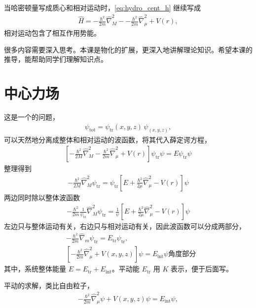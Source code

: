 当哈密顿量写成质心和相对运动时，\eqref{eq:hydro_cent_h} 继续写成
\begin{align}
    \hat H = -\frac{\hbar^2}{2m} \hat \nabla_M^2 -
    -\frac{\hbar^2}{2m} \hat \nabla_\mu^2 + V(r),
\end{align}
相对运动包含了相互作用势能。

很多内容需要深入思考。本课是物化的扩展，更深入地讲解理论知识。希望本课的推导，能帮助同学们理解知识点。

\section{中心力场}
这是一个的问题，
\begin{align}
    \psi_{\mathrm{tot}} = \psi_{\mathrm{tr}}(x,y,z) \,\psi_(x,y,z),
\end{align}
可以天然地分离成整体和相对运动的波函数，将其代入薛定谔方程，
\begin{align}
    \left[
        -\frac{\hbar^2}{2M}\hat\nabla_M^2 - \frac{\hbar^2}{2m} \hat\nabla_\mu^2 + V(r) 
    \right] \psi_{\mathrm{tr}} \psi = E \psi_{\mathrm{tr}} \psi
\end{align}
整理得到
\begin{align}
    - \frac{\hbar^2}{2M}\hat\nabla_M^2 \psi_{\mathrm{tr}} = \psi_{\mathrm{tr}} \left[
        E + \frac{\hbar^2}{2\mu}\hat\nabla_\mu^2 - V(r)
    \right]\psi
\end{align}
两边同时除以整体波函数
\begin{align}
    -\frac{\hbar^2}{2m} \frac1{\psi_{\mathrm{tr}}} \hat\nabla_M^2 \psi_{\mathrm{tr}} = \frac1{\psi} \left[
        E + \frac{\hbar^2}{2\mu}\hat\nabla_\mu^2 - V(r)
    \right]\psi
\end{align}
左边只与整体运动有关，右边只与相对运动有关，因此波函数可以分成两部分，
\begin{align}
    & - \frac{\hbar^2}{2m} \hat \nabla_m \psi_{\mathrm{tr}} = E_\mathrm{tr} \psi_{\mathrm{tr}}, 
    \label{eq:hydro_Htr}
    \\
    & \left[-\frac{\hbar^2}{2m} \hat\nabla_\mu^2 + V(x,y,z)\right] \psi = E_\mathrm{int} \psi
    \label{eq:hydro_Hint}
    角度部分\end{align}
其中，系统整体能量 $E = E_{\mathrm{tr}} + E_{\mathrm{int}}$。平动能 $E_{\mathrm{tr}}$ 用 $K$ 表示，便于后面写。

平动的求解，类比自由粒子，
\begin{align}
    -\frac{\hbar^2}{2m} \hat\nabla_\mu^2 \psi + V(x,y,z) \psi = E_\mathrm{int} \psi, 
\end{align}

